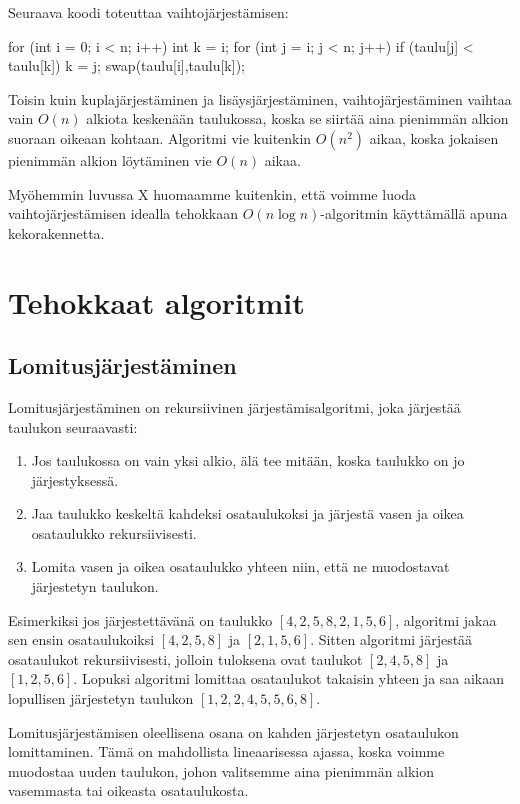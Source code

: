 Seuraava koodi toteuttaa vaihtojärjestämisen:

\begin{code}
for (int i = 0; i < n; i++) {
    int k = i;
    for (int j = i; j < n; j++) {
        if (taulu[j] < taulu[k]) k = j;
    }
    swap(taulu[i],taulu[k]);
}
\end{code}

Toisin kuin kuplajärjestäminen ja lisäysjärjestäminen,
vaihtojärjestäminen vaihtaa vain $O(n)$ alkiota keskenään
taulukossa, koska se siirtää aina pienimmän alkion
suoraan oikeaan kohtaan.
Algoritmi vie kuitenkin $O(n^2)$ aikaa,
koska jokaisen pienimmän alkion löytäminen vie $O(n)$ aikaa.

Myöhemmin luvussa X huomaamme kuitenkin,
että voimme luoda vaihtojärjestämisen idealla tehokkaan
$O(n \log n)$-algoritmin käyttämällä apuna kekorakennetta.

\section{Tehokkaat algoritmit}

\subsection{Lomitusjärjestäminen}

Lomitusjärjestäminen on rekursiivinen järjestämisalgoritmi,
joka järjestää taulukon seuraavasti:

\begin{enumerate}
\item Jos taulukossa on vain yksi alkio,
älä tee mitään, koska taulukko on jo järjestyksessä.
\item Jaa taulukko keskeltä kahdeksi osataulukoksi ja järjestä
vasen ja oikea osataulukko rekursiivisesti.
\item Lomita vasen ja oikea osataulukko yhteen niin, että ne muodostavat
järjestetyn taulukon.
\end{enumerate}

Esimerkiksi jos järjestettävänä on taulukko $[4,2,5,8,2,1,5,6]$,
algoritmi jakaa sen ensin osataulukoiksi $[4,2,5,8]$ ja $[2,1,5,6]$.
Sitten algoritmi järjestää osataulukot rekursiivisesti,
jolloin tuloksena ovat taulukot $[2,4,5,8]$ ja $[1,2,5,6]$.
Lopuksi algoritmi lomittaa osataulukot takaisin yhteen
ja saa aikaan lopullisen järjestetyn taulukon $[1,2,2,4,5,5,6,8]$.

Lomitusjärjestämisen oleellisena osana on kahden järjestetyn osataulukon
lomittaminen. Tämä on mahdollista lineaarisessa ajassa, koska
voimme muodostaa uuden taulukon, johon valitsemme aina pienimmän
alkion vasemmasta tai oikeasta osataulukosta.

